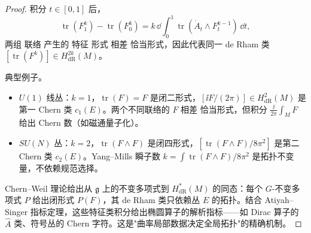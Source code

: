 \begin{proof}
积分 $t\in[0,1]$ 后，
\begin{equation*}
\operatorname{tr}(F_1^k)-\operatorname{tr}(F_0^k)
=k\,\dd\int_0^1\operatorname{tr}(\dot A_t\wedge F_t^{k-1})\,\dd t,
\end{equation*}
两组 联络 产生的 特征 形式 相差 恰当形式，因此代表同一 de Rham 类 $[\operatorname{tr}(F^k)]\in H_{\mathrm{dR}}^{2k}(M)$。

典型例子。
\begin{itemize}
\item $U(1)$ 线丛：$k=1$，$\operatorname{tr}(F)=F$ 是闭二形式，$[\ii F/(2\pi)]\in H^2_{\mathrm{dR}}(M)$ 是第一 Chern 类 $c_1(E)$。两个不同联络的 $F$ 相差 恰当形式，但积分 $\frac{\ii}{2\pi}\int_M F$ 给出 Chern 数（如磁通量子化）。
\item $SU(N)$ 丛：$k=2$，$\operatorname{tr}(F\wedge F)$ 是闭四形式，$[\operatorname{tr}(F\wedge F)/8\pi^2]$ 是第二 Chern 类 $c_2(E)$。Yang--Mills 瞬子数 $k=\int\operatorname{tr}(F\wedge F)/8\pi^2$ 是拓扑不变量，不依赖规范选择。
\end{itemize}

Chern--Weil 理论给出从 $\mathfrak g$ 上的不变多项式到 $H_{\mathrm{dR}}^*(M)$ 的同态：每个 $G$-不变多项式 $P$ 给出闭形式 $P(F)$，其 de Rham 类只依赖丛 $E$ 的拓扑。结合 Atiyah--Singer 指标定理，这些特征类积分给出椭圆算子的解析指标——如 Dirac 算子的 $\hat A$ 类、符号丛的 Chern 字符。这是"曲率局部数据决定全局拓扑"的精确机制。
\end{proof}

